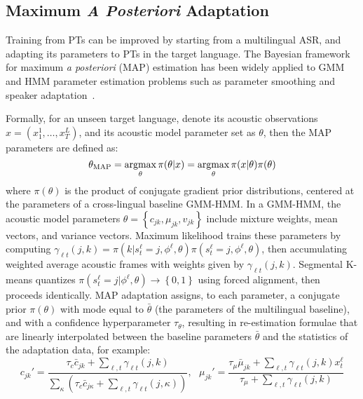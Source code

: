 \subsection{Maximum {\em A Posteriori} Adaptation}
\label{sec:adaptation}

Training from PTs can be improved by starting from a multilingual ASR,
and adapting its parameters to PTs in the target language.  The
Bayesian framework for maximum {\em a posteriori} (MAP) estimation
has been widely applied to GMM and HMM parameter estimation problems
such as parameter smoothing and speaker
adaptation~\cite{gauvain1994maximum}.

Formally, for an unseen target language, denote its acoustic
observations $x = ( x_1^1, \ldots, x_{T}^L )$, and its acoustic model
parameter set as $\theta$, then the MAP parameters are defined as:
\begin{equation}
  \theta_{\mathrm{MAP}}  = \argmax_{\theta} \pi(\theta | x) 
= \argmax_{\theta} \pi( x | \theta ) \pi(\theta)
\label{eq:map}
\end{equation}
\noindent where $\pi(\theta)$ is the product of conjugate gradient
prior distributions, centered at the parameters of a cross-lingual
baseline GMM-HMM.  In a GMM-HMM, the acoustic model 
parameters $\theta=\left\{c_{jk},\mu_{jk},v_{jk}\right\}$ include
mixture weights, mean vectors, and variance vectors.  Maximum
likelihood trains these parameters by computing $\gamma_{\ell
  t}(j,k)=\pi(k|s_t^\ell =j,\phi^\ell,\theta)\pi(s_t^\ell
=j,\phi^\ell,\theta)$, then accumulating weighted average acoustic
frames with weights given by $\gamma_{\ell t}(j,k)$. Segmental K-means
quantizes $\pi(s_t^\ell
=j|\phi^\ell,\theta)\rightarrow\left\{0,1\right\}$ using forced
alignment, then proceeds identically.  MAP adaptation assigns, to each
parameter, a conjugate prior $\pi(\theta)$ with mode equal to
$\bar\theta$ (the parameters of the multilingual baseline), and with a
confidence hyperparameter $\tau_\theta$, resulting in re-estimation
formulae that are linearly interpolated between the baseline
parameters $\bar\theta$ and the statistics of the adaptation data, for
example:
\[
c_{jk}'=\frac{\tau_c\bar{c}_{jk}+\sum_{\ell,t}\gamma_{\ell t}(j,k)}
{\sum_{\kappa}\left(\tau_c\bar{c}_{j\kappa}+
  \sum_{\ell,t}\gamma_{\ell t}(j,\kappa)\right)},~~~
\mu_{jk}'=\frac{\tau_\mu\bar{\mu}_{jk}+\sum_{\ell,t}\gamma_{\ell t}(j,k)x_t^\ell}
   {\tau_\mu+\sum_{\ell,t}\gamma_{\ell t}(j,k)}
\]


